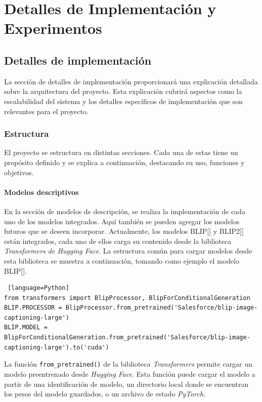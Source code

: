 \chapter{Detalles de Implementación y Experimentos}\label{chapter:implementation}


\section{Detalles de implementaci\'on}
La sección de detalles de implementación proporcionar\'a una explicación detallada sobre la arquitectura del proyecto. Esta explicación cubrir\'a aspectos como la escalabilidad del sistema y los detalles específicos de implementación que son relevantes para el proyecto.

\subsection{Estructura}
El proyecto se estructura en distintas secciones. Cada una de estas tiene un propósito definido y se explica a continuación, destacando su uso, funciones y objetivos.

\subsubsection{Modelos descriptivos}
 En la sección de modelos de descripción, se realiza la implementación de cada uno de los modelos integrados. Aquí también se pueden agregar los modelos futuros que se deseen incorporar. Actualmente, los modelos BLIP[\cite{huggingface2022blip}] y BLIP2[\cite{huggingface-blip2}] est\'an integrados, cada uno de ellos carga su contenido desde la biblioteca \textit{Transformers de Hugging Face}. La estructura común para cargar modelos desde esta biblioteca se muestra a continuación, tomando como ejemplo el modelo BLIP[\cite{huggingface2022blip}].

\begin{lstlisting} [language=Python]
from transformers import BlipProcessor, BlipForConditionalGeneration
BLIP.PROCESSOR = BlipProcessor.from_pretrained('Salesforce/blip-image-captioning-large')
BLIP.MODEL = BlipForConditionalGeneration.from_pretrained('Salesforce/blip-image-captioning-large').to('cuda')
\end{lstlisting}

La función \verb|from_pretrained()| de la biblioteca \textit{Transformers} permite cargar un modelo preentrenado desde \textit{Hugging Face}. Esta función puede cargar el modelo a partir de una identificación de modelo, un directorio local donde se encuentran los pesos del modelo guardados, o un archivo de estado \textit{PyTorch}. 

